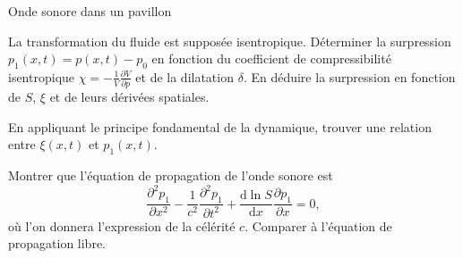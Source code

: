 \begin{exo}[PSI][3][TD]{Onde sonore dans un pavillon}
\begin{quest}
	\item La transformation du fluide est supposée isentropique. Déterminer la surpression $p_1(x,t) = p(x,t) - p_0$ en fonction du coefficient de compressibilité isentropique $\chi = -\frac{1}{V} \frac{\partial V}{\partial p}$ et de la dilatation $\delta$. En déduire la surpression en fonction de $S$, $\xi$ et de leurs dérivées spatiales. %
	\item En appliquant le principe fondamental de la dynamique, trouver une relation entre $\xi(x,t)$ et $p_1(x,t)$.
\sol{
    On écrit le PDF pour une particule de fluide de masse $\d m  \simeq \rho_0 \d V$. On trouve 
    \eqbox{
        \rho_0 \frac{\partial^2 \xi}{\partial t^2} = - \frac{\partial p_1}{\partial x}
    }
}
\item Montrer que l'équation de propagation de l'onde sonore est
	\begin{equation*}
	\frac{\partial^2 p_1}{\partial x^2} - \frac{1}{c^2}\frac{\partial^2 p_1}{\partial t^2} + \frac{\mathrm{d} \ln S}{\mathrm{d} x} \frac{\partial p_1}{\partial x} =0,
\end{equation*}
où l'on donnera l'expression de la célérité $c$. Comparer à l'équation de propagation libre.
\end{quest}
\end{exo}
